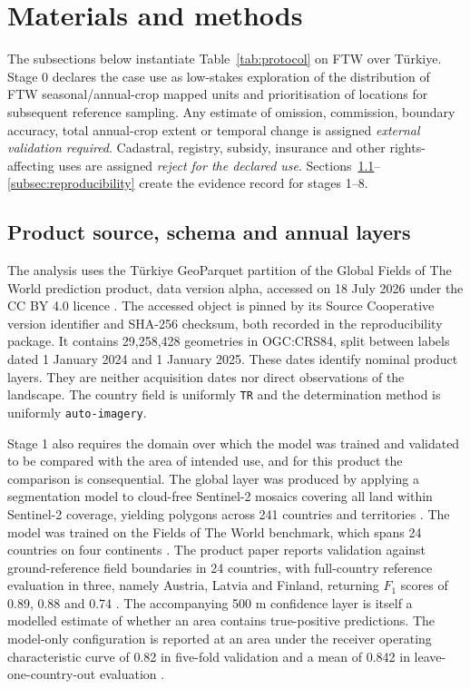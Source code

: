 \documentclass[pdflatex,sn-basic]{sn-jnl}
\begin{document}
\section{Materials and methods}\label{sec:methods}

The subsections below instantiate Table~\ref{tab:protocol} on FTW over Türkiye. Stage 0 declares the case use as low-stakes exploration of the distribution of FTW seasonal/annual-crop mapped units and prioritisation of locations for subsequent reference sampling. Any estimate of omission, commission, boundary accuracy, total annual-crop extent or temporal change is assigned \emph{external validation required}. Cadastral, registry, subsidy, insurance and other rights-affecting uses are assigned \emph{reject for the declared use}. Sections~\ref{subsec:source}--\ref{subsec:reproducibility} create the evidence record for stages 1--8.

\subsection{Product source, schema and annual layers}\label{subsec:source}

The analysis uses the Türkiye GeoParquet partition of the Global Fields of The World prediction product, data version alpha, accessed on 18 July 2026 under the CC BY 4.0 licence \citep{fields_of_the_world_global_2026}. The accessed object is pinned by its Source Cooperative version identifier and SHA-256 checksum, both recorded in the reproducibility package. It contains 29,258,428 geometries in OGC:CRS84, split between labels dated 1 January 2024 and 1 January 2025. These dates identify nominal product layers. They are neither acquisition dates nor direct observations of the landscape. The country field is uniformly \texttt{TR} and the determination method is uniformly \texttt{auto-imagery}.

Stage 1 also requires the domain over which the model was trained and validated to be compared with the area of intended use, and for this product the comparison is consequential. The global layer was produced by applying a segmentation model to cloud-free Sentinel-2 mosaics covering all land within Sentinel-2 coverage, yielding polygons across 241 countries and territories \citep{robinson_first_2026,muhawenayo_prue_2026}. The model was trained on the Fields of The World benchmark, which spans 24 countries on four continents \citep{kerner_fields_2025}. The product paper reports validation against ground-reference field boundaries in 24 countries, with full-country reference evaluation in three, namely Austria, Latvia and Finland, returning $F_1$ scores of 0.89, 0.88 and 0.74 \citep{robinson_first_2026}. The accompanying 500 m confidence layer is itself a modelled estimate of whether an area contains true-positive predictions. The model-only configuration is reported at an area under the receiver operating characteristic curve of 0.82 in five-fold validation and a mean of 0.842 in leave-one-country-out evaluation \citep{robinson_first_2026}.
\end{document}
